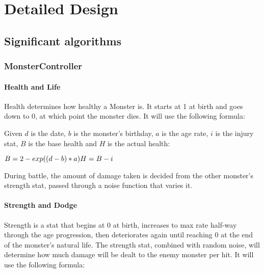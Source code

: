 \section{Detailed Design}

\subsection{Significant algorithms}
\subsubsection{MonsterController}
\paragraph{Health and Life} Health determines how healthy a Monster is. It starts at 1 at birth and goes down to 0, at which point the monster dies. It will use the following formula:

Given \begin{math}d\end{math} is the date, \begin{math}b\end{math} is the monster's birthday, \begin{math}a\end{math} is the age rate, \begin{math}i\end{math} is the injury stat, \begin{math}B\end{math} is the base health and \begin{math}H\end{math} is the actual health:

\begin{math}
B = 2-exp((d-b)*a)\\
H = B-i
\end{math}

During battle, the amount of damage taken is decided from the other monster's strength stat, passed through a noise function that varies it.
\paragraph{Strength and Dodge} Strength is a stat that begins at 0 at birth, increases to max rate half-way through the age progression, then deteriorates again until reaching 0 at the end of the monster's natural life. The strength stat, combined with random noise, will determine how much damage will be dealt to the enemy monster per hit. It will use the following formula:

